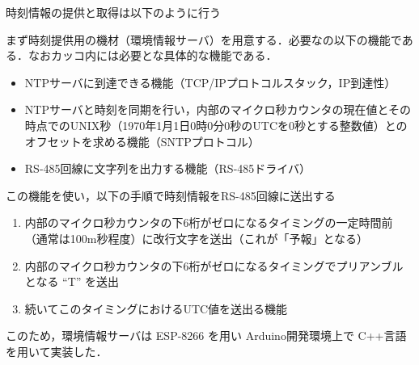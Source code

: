 

 \par

時刻情報の提供と取得は以下のように行う

まず時刻提供用の機材（環境情報サーバ）を用意する．必要なの以下の機能である．なおカッコ内には必要とな具体的な機能である．

\begin{itemize}
\item NTPサーバに到達できる機能（TCP/IPプロトコルスタック，IP到達性）
\item NTPサーバと時刻を同期を行い，内部のマイクロ秒カウンタの現在値とその時点でのUNIX秒（1970年1月1日0時0分0秒のUTCを0秒とする整数値）とのオフセットを求める機能（SNTPプロトコル）
\item RS-485回線に文字列を出力する機能（RS-485ドライバ）
\end{itemize}

この機能を使い，以下の手順で時刻情報をRS-485回線に送出する

\begin{enumerate}
\item 内部のマイクロ秒カウンタの下6桁がゼロになるタイミングの一定時間前（通常は100m秒程度）に改行文字を送出（これが「予報」となる）
\item 内部のマイクロ秒カウンタの下6桁がゼロになるタイミングでプリアンブルとなる ``T'' を送出
\item 続いてこのタイミングにおけるUTC値を送出る機能
\end{enumerate}

このため，環境情報サーバは ESP-8266 を用い Arduino開発環境上で C++言語を用いて実装した．


